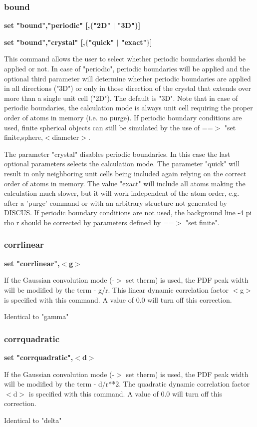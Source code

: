 \subsubsection{bound}
{\bf set "bound","periodic" [,$ \{$"2D" $| $ "3D"$\} $] \par }
{\bf set "bound","crystal" [,$ \{$"quick" $| $ "exact"$\} $] \par }
\par
\vspace{3pt}
This command allows the user to select whether periodic boundaries 
should be applied or not. In case of "periodic", periodic boundaries 
will be applied and the optional third parameter will determine 
whether periodic boundaries are applied in all directions ("3D") 
or only in those direction of the crystal that extends over more 
than a single unit cell ("2D"). The default is "3D". Note that in 
case of periodic boundaries, the calculation mode is always unit 
cell requiring the proper order of atoms in memory (i.e. no purge). 
If periodic boundary conditions are used, finite spherical objects 
can still be simulated by the use of ==$> $ "set finite,sphere,$ <$diameter$> $. 
\par
The parameter "crystal" disables periodic boundaries. In this case 
the last optional parameters selects the calculation mode. The 
parameter "quick" will result in only neighboring unit cells being 
included again relying on the correct order of atoms in memory. The 
value "exact" will include all atoms making the calculation much 
slower, but it will work independent of the atom order, e.g. after 
a 'purge' command or with an arbitrary structure not generated by 
DISCUS. If periodic boundary conditions are not used, the background 
line -4 pi rho r should be corrected by parameters defined by 
==$> $ "set finite". 
\subsubsection{corrlinear}
{\bf set "corrlinear",$ <$g$> $ \par }
\par
\vspace{3pt}
If the Gaussian convolution mode (-$> $ set therm) is used, the PDF 
peak width will be modified by the term - g/r. This linear 
dynamic correlation factor $ <$g$> $ is specified with this command. A 
value of 0.0 will turn off this correction. 
\par
Identical to "gamma" 
\subsubsection{corrquadratic}
{\bf set "corrquadratic",$ <$d$> $ \par }
\par
\vspace{3pt}
If the Gaussian convolution mode (-$> $ set therm) is used, the PDF 
peak width will be modified by the term - d/r**2. The quadratic 
dynamic correlation factor $ <$d$> $ is specified with this command. A 
value of 0.0 will turn off this correction. 
\par
Identical to "delta" 
